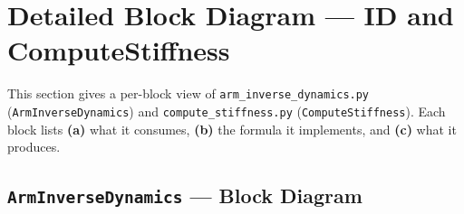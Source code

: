 \documentclass[11pt,a4paper]{article}
\newcommand{\py}[1]{\texttt{\color{PipeBlue}#1}}
\newcommand{\file}[1]{\texttt{\color{PipePurple}#1}}
\begin{document}
\section{Detailed Block Diagram — ID and ComputeStiffness}
\label{sec:block-diagram}

This section gives a per-block view of \file{arm\_inverse\_dynamics.py}
(\py{ArmInverseDynamics}) and \file{compute\_stiffness.py}
(\py{ComputeStiffness}). Each block lists \textbf{(a)} what it consumes,
\textbf{(b)} the formula it implements, and \textbf{(c)} what it produces.

\subsection{\texttt{ArmInverseDynamics} — Block Diagram}
\end{document}
